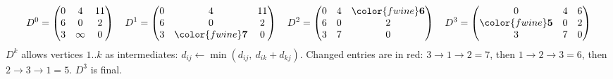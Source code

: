 \[
D^{0} = \begin{pmatrix} 0 & 4 & 11\\ 6 & 0 & 2\\ 3 & \infty & 0 \end{pmatrix}\quad
D^{1} = \begin{pmatrix} 0 & 4 & 11\\ 6 & 0 & 2\\ 3 & \color{fwine}\mathbf{7} & 0 \end{pmatrix}\quad
D^{2} = \begin{pmatrix} 0 & 4 & \color{fwine}\mathbf{6}\\ 6 & 0 & 2\\ 3 & 7 & 0 \end{pmatrix}\quad
D^{3} = \begin{pmatrix} 0 & 4 & 6\\ \color{fwine}\mathbf{5} & 0 & 2\\ 3 & 7 & 0 \end{pmatrix}
\]
\noindent $D^{k}$ allows vertices $1..k$ as intermediates: $d_{ij} \leftarrow \min(d_{ij},\ d_{ik} + d_{kj})$.
Changed entries are in red: $3\to1\to2 = 7$, then $1\to2\to3 = 6$, then $2\to3\to1 = 5$. $D^3$ is final.
